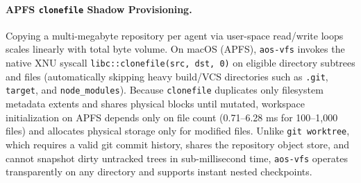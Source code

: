\documentclass[10pt,twocolumn]{article}
\begin{document}
\paragraph{APFS \texttt{clonefile} Shadow Provisioning.} Copying a multi-megabyte repository per agent via user-space read/write loops scales linearly with total byte volume. On macOS (APFS), \texttt{aos-vfs} invokes the native XNU syscall \texttt{libc::clonefile(src, dst, 0)} on eligible directory subtrees and files (automatically skipping heavy build/VCS directories such as \texttt{.git}, \texttt{target}, and \texttt{node\_modules}). Because \texttt{clonefile} duplicates only filesystem metadata extents and shares physical blocks until mutated, workspace initialization on APFS depends only on file count (0.71--6.28 ms for 100--1,000 files) and allocates physical storage only for modified files. Unlike \texttt{git worktree}, which requires a valid git commit history, shares the repository object store, and cannot snapshot dirty untracked trees in sub-millisecond time, \texttt{aos-vfs} operates transparently on any directory and supports instant nested checkpoints.
\end{document}
